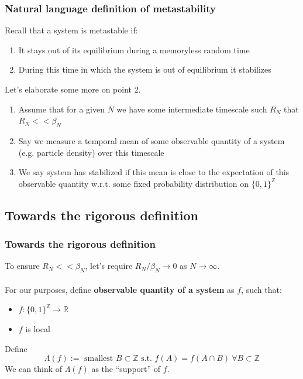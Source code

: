 \documentclass{beamer}
\begin{document}
\begin{frame}
    \frametitle{Natural language definition of metastability}

    Recall that a system is metastable if:
    \begin{enumerate}
        \item It stays out of its equilibrium during a memoryless random time
        \item During this time in which the system is out of equilibrium it stabilizes
    \end{enumerate}
    Let's elaborate some more on point 2.
    \begin{enumerate}
        \item Assume that for a given $N$ we have some intermediate timescale such $R_N$ that $R_N << \beta_N$
        \item Say we measure a temporal mean of some observable quantity of a system (e.g. particle density) over this timescale
        \item We say system has stabilized if this mean is close to the expectation of this observable quantity w.r.t. some fixed probability distribution on $\{0,1\}^{\mathbb{Z}}$
    \end{enumerate}
\end{frame}

\subsection{Towards the rigorous definition} %

\begin{frame}
    \frametitle{Towards the rigorous definition}
    To ensure $R_N << \beta_N$, let's require $R_N / \beta_N \rightarrow 0$ as $N \rightarrow \infty$.
    \\~\\ 
    For our purposes, define \textbf{observable quantity of a system} as $f$, such that:
    \begin{itemize}
        \item $f : \{0,1\}^{\mathbb{Z}} \rightarrow \mathbb{R}$
        \item $f$ is local
    \end{itemize}
    Define 
    \[
        \Lambda(f) :=  \text{ smallest } B\subset \mathbb{Z} \text{ s.t. } f(A) = f(A\cap B) \ \forall B \subset \mathbb{Z}
    \]
    We can think of $\Lambda(f)$ as the ``support'' of $f$.
\end{frame}
\end{document}
